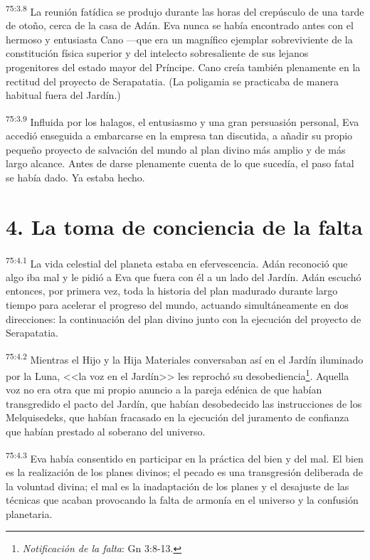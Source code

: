 \par
\textsuperscript{75:3.8} La reunión fatídica se produjo durante las horas del crepúsculo de una tarde de otoño, cerca de la casa de Adán. Eva nunca se había encontrado antes con el hermoso y entusiasta Cano ---que era un magnífico ejemplar sobreviviente de la constitución física superior y del intelecto sobresaliente de sus lejanos progenitores del estado mayor del Príncipe. Cano creía también plenamente en la rectitud del proyecto de Serapatatia. (La poligamia se practicaba de manera habitual fuera del Jardín.)

\par
\textsuperscript{75:3.9} Influida por los halagos, el entusiasmo y una gran persuasión personal, Eva accedió enseguida a embarcarse en la empresa tan discutida, a añadir su propio pequeño proyecto de salvación del mundo al plan divino más amplio y de más largo alcance. Antes de darse plenamente cuenta de lo que sucedía, el paso fatal se había dado. Ya estaba hecho.

\section*{4. La toma de conciencia de la falta}
\par
\textsuperscript{75:4.1} La vida celestial del planeta estaba en efervescencia. Adán reconoció que algo iba mal y le pidió a Eva que fuera con él a un lado del Jardín. Adán escuchó entonces, por primera vez, toda la historia del plan madurado durante largo tiempo para acelerar el progreso del mundo, actuando simultáneamente en dos direcciones: la continuación del plan divino junto con la ejecución del proyecto de Serapatatia.

\par
\textsuperscript{75:4.2} Mientras el Hijo y la Hija Materiales conversaban así en el Jardín iluminado por la Luna, <<la voz en el Jardín>> les reprochó su desobediencia\footnote{\textit{Notificación de la falta}: Gn 3:8-13.}. Aquella voz no era otra que mi propio anuncio a la pareja edénica de que habían transgredido el pacto del Jardín, que habían desobedecido las instrucciones de los Melquisedeks, que habían fracasado en la ejecución del juramento de confianza que habían prestado al soberano del universo.

\par
\textsuperscript{75:4.3} Eva había consentido en participar en la práctica del bien y del mal. El bien es la realización de los planes divinos; el pecado es una transgresión deliberada de la voluntad divina; el mal es la inadaptación de los planes y el desajuste de las técnicas que acaban provocando la falta de armonía en el universo y la confusión planetaria.

